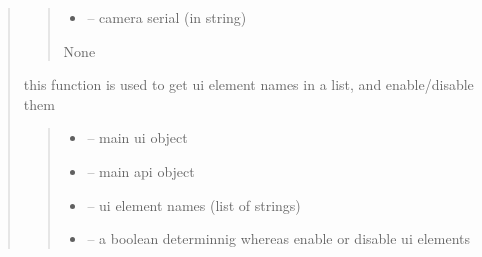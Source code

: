\documentclass[letterpaper,10pt,english]{sphinxmanual}
\begin{document}
\begin{quote}
\begin{savenotes}
\begin{fulllineitems}
\begin{quote}
\begin{description}
\begin{itemize}
\item {} 
\sphinxAtStartPar
{} – camera serial (in string)

\end{itemize}

\sphinxAtStartPar
None

\end{description}\end{quote}

\end{fulllineitems}\end{savenotes}


\begin{savenotes}\begin{fulllineitems}
\label{\detokenize{setting/backend/camera_funcs:oxin.backend.camera_funcs.set_widjets_enable_or_disable}}
\pysigstartsignatures
{}
\pysigstopsignatures
\sphinxAtStartPar
this function is used to get ui element names in a list, and enable/disable them
\begin{quote}\begin{description}
\begin{itemize}
\item {} 
\sphinxAtStartPar
{} – main ui object

\item {} 
\sphinxAtStartPar
{} – main api object

\item {} 
\sphinxAtStartPar
{} – ui element names (list of strings)

\item {} 
\sphinxAtStartPar
{} – a boolean determinnig whereas enable or disable ui elements

\end{itemize}


\end{description}
\end{quote}
\end{fulllineitems}
\end{savenotes}
\end{quote}
\end{document}
